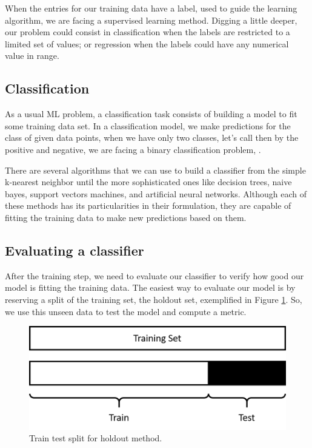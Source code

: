 	When the entries for our training data have a label, used to guide the learning algorithm, we are facing a supervised learning method. Digging a little deeper, our problem could consist in classification when the labels are restricted to a limited set of values; or regression when the labels could have any numerical value in range.

	\subsection{Classification}

	As a usual ML problem, a classification task consists of building a model to fit some training data set. In a classification model, we make predictions for the class of given data points, when we have only two classes, let's call then by the positive and negative, we are facing a binary classification problem, \cite{pmlr-v81-menon18a}.

	There are several algorithms that we can use to build a classifier from the simple k-nearest neighbor until the more sophisticated ones like decision trees, naive bayes, support vectors machines, and artificial neural networks. Although each of these methods has its particularities in their formulation, they are capable of fitting the training data to make new predictions based on them.



	\subsection{Evaluating a classifier}

	After the training step, we need to evaluate our classifier to verify how good our model is fitting the training data. The easiest way to evaluate our model is by reserving a split of the training set, the holdout set, exemplified in Figure \ref{fig:holdout-evaluate}. So, we use this unseen data to test the model and compute a metric.

	\begin{figure}[h!]
		\centering
		\includegraphics[width=0.5\linewidth]{01.Chapters/02.Background/holdout-evaluate}
		\caption{Train test split for holdout method.}
		\label{fig:holdout-evaluate}
	\end{figure}

